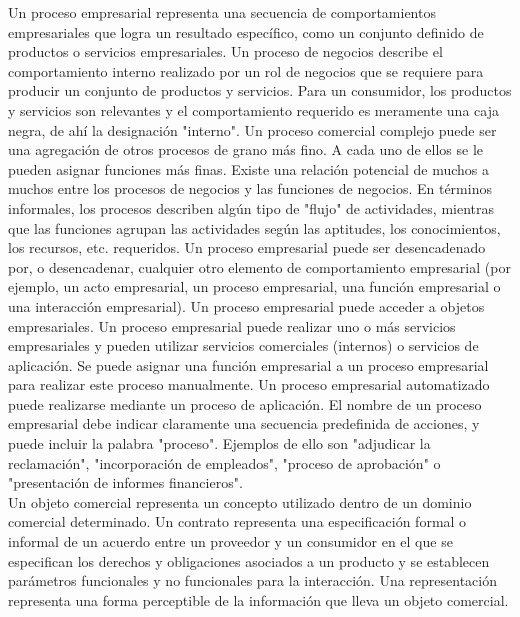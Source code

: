 Un proceso empresarial representa una secuencia de comportamientos empresariales que logra un resultado específico, como un conjunto definido de productos o servicios empresariales.
Un proceso de negocios describe el comportamiento interno realizado por un rol de negocios que se requiere para producir un conjunto de productos y servicios. Para un consumidor, los productos y servicios son relevantes y el comportamiento requerido es meramente una caja negra, de ahí la designación "interno".
Un proceso comercial complejo puede ser una agregación de otros procesos de grano más fino. A cada uno de ellos se le pueden asignar funciones más finas.
Existe una relación potencial de muchos a muchos entre los procesos de negocios y las funciones de negocios. En términos informales, los procesos describen algún tipo de "flujo" de actividades, mientras que las funciones agrupan las actividades según las aptitudes, los conocimientos, los recursos, etc. requeridos. Un proceso empresarial puede ser desencadenado por, o desencadenar, cualquier otro elemento de comportamiento empresarial (por ejemplo, un acto empresarial, un proceso empresarial, una función empresarial o una interacción empresarial). Un proceso empresarial puede acceder a objetos empresariales. Un proceso empresarial puede realizar uno o más servicios empresariales y pueden utilizar servicios comerciales (internos) o servicios de aplicación. Se puede asignar una función empresarial a un proceso empresarial para realizar este proceso manualmente. Un proceso empresarial automatizado puede realizarse mediante un proceso de aplicación. El nombre de un proceso empresarial debe indicar claramente una secuencia predefinida de acciones, y puede incluir la palabra "proceso". Ejemplos de ello son "adjudicar la reclamación", "incorporación de empleados", "proceso de aprobación" o "presentación de informes financieros". \\

Un objeto comercial representa un concepto utilizado dentro de un dominio comercial determinado. Un contrato representa una especificación formal o informal de un acuerdo entre un proveedor y un consumidor en el que se especifican los derechos y obligaciones asociados a un producto y se establecen parámetros funcionales y no funcionales para la interacción. Una representación representa una forma perceptible de la información que lleva un objeto comercial.

\clearpage
